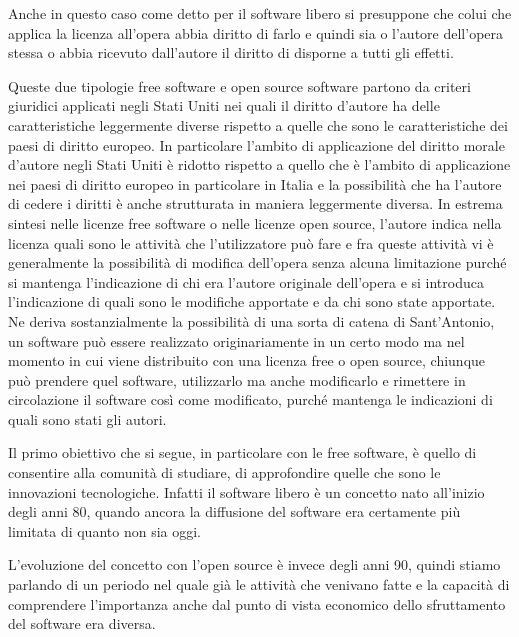 Anche in questo caso come detto per il software libero si presuppone che colui che applica la licenza all'opera abbia diritto di farlo e quindi sia o l'autore dell'opera stessa o abbia ricevuto dall'autore il diritto di disporne a tutti gli effetti. 

Queste due tipologie free software e open source software partono da criteri giuridici applicati negli Stati Uniti nei quali il diritto d'autore ha delle caratteristiche leggermente diverse rispetto a quelle che sono le caratteristiche dei paesi di diritto europeo. In particolare l'ambito di applicazione del diritto morale d'autore negli Stati Uniti è ridotto rispetto a quello che è l'ambito di applicazione nei paesi di diritto europeo in particolare in Italia e la possibilità che ha l'autore di cedere i diritti è anche strutturata in maniera leggermente diversa. 
In estrema sintesi nelle licenze free software o nelle licenze open source, l'autore indica nella licenza quali sono le attività che l'utilizzatore può fare e fra queste attività vi è generalmente la possibilità di modifica dell'opera senza alcuna limitazione purché  si mantenga l'indicazione di chi era l'autore originale dell'opera e si introduca l'indicazione di quali sono le modifiche apportate e da chi sono state apportate. 
Ne deriva sostanzialmente la possibilità di una sorta di catena di Sant'Antonio, un software può essere realizzato originariamente in un certo modo ma nel momento in cui viene distribuito con una licenza free o open source, chiunque può prendere quel software, utilizzarlo ma anche modificarlo e rimettere in circolazione il software così come modificato, purché mantenga le indicazioni di quali sono stati gli autori. 

Il primo obiettivo che si segue, in particolare con le free software, è quello di consentire alla comunità di studiare, di approfondire quelle che sono le innovazioni tecnologiche. Infatti il software libero è un concetto nato all'inizio degli anni 80, quando ancora la diffusione del software era certamente più limitata di quanto non sia oggi. 

L'evoluzione del concetto con l'open source è invece degli anni 90, quindi stiamo parlando di un periodo nel quale già le attività che venivano fatte e la capacità di comprendere l'importanza anche dal punto di vista economico dello sfruttamento del software era diversa. 

